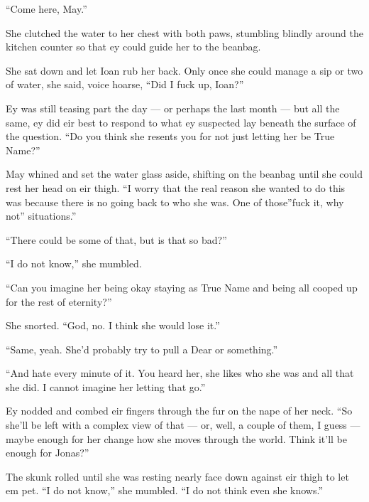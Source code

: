 ``Come here, May.''

She clutched the water to her chest with both paws, stumbling blindly around the kitchen counter so that ey could guide her to the beanbag.

She sat down and let Ioan rub her back. Only once she could manage a sip or two of water, she said, voice hoarse, ``Did I fuck up, Ioan?''

Ey was still teasing part the day — or perhaps the last month — but all the same, ey did eir best to respond to what ey suspected lay beneath the surface of the question. ``Do you think she resents you for not just letting her be True Name?''

May whined and set the water glass aside, shifting on the beanbag until she could rest her head on eir thigh. ``I worry that the real reason she wanted to do this was because there is no going back to who she was. One of those''fuck it, why not'' situations.''

``There could be some of that, but is that so bad?''

``I do not know,'' she mumbled.

``Can you imagine her being okay staying as True Name and being all cooped up for the rest of eternity?''

She snorted. ``God, no. I think she would lose it.''

``Same, yeah. She'd probably try to pull a Dear or something.''

``And hate every minute of it. You heard her, she likes who she was and all that she did. I cannot imagine her letting that go.''

Ey nodded and combed eir fingers through the fur on the nape of her neck. ``So she'll be left with a complex view of that — or, well, a couple of them, I guess — maybe enough for her change how she moves through the world. Think it'll be enough for Jonas?''

The skunk rolled until she was resting nearly face down against eir thigh to let em pet. ``I do not know,'' she mumbled. ``I do not think even she knows.''
